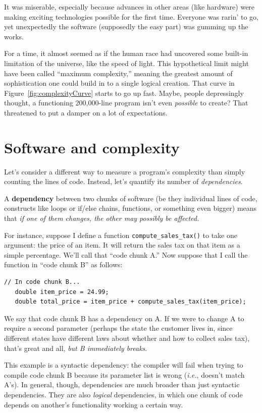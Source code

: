 It was miserable, especially because advances in other areas (like hardware)
were making exciting technologies possible for the first time. Everyone was
rarin' to go, yet unexpectedly the software (supposedly the easy part) was
gumming up the works.

For a time, it almost seemed as if the human race had uncovered some built-in
limitation of the universe, like the speed of light. This hypothetical limit
might have been called ``maximum complexity,'' meaning the greatest amount of
sophistication one could build in to a single logical creation. That curve in
Figure~\ref{fig:complexityCurve} starts to go up fast. Maybe, people
depressingly thought, a functioning 200,000-line program isn't even
\textit{possible} to create? That threatened to put a damper on a lot of
expectations.

\section{Software and complexity}

Let's consider a different way to measure a program's complexity than simply
counting the lines of code. Instead, let's quantify its number of
\textit{dependencies}.

A \textbf{dependency} between two chunks of software (be they individual lines
of code, constructs like loops or if/else chains, functions, or something even
bigger) means that \textit{if one of them changes, the other may possibly be
affected.}

For instance, suppose I define a function \texttt{compute\_sales\_tax()} to
take one argument: the price of an item. It will return the sales tax on that
item as a simple percentage. We'll call that ``code chunk A.'' Now suppose
that I call the function in ``code chunk B'' as follows:

\begin{Verbatim}[fontsize=\small,samepage=true,frame=single]
   // In code chunk B...
   double item_price = 24.99;
   double total_price = item_price + compute_sales_tax(item_price);
\end{Verbatim}

We say that code chunk B has a dependency on A. If we were to change A to
require a second parameter (perhaps the state the customer lives in, since
different states have different laws about whether and how to collect sales
tax), that's great and all, \textit{but B immediately breaks}.

This example is a syntactic dependency: the compiler will fail when trying to
compile code chunk B because its parameter list is wrong (\textit{i.e.},
doesn't match A's). In general, though, dependencies are much broader than
just syntactic dependencies. They are also \textit{logical} dependencies, in
which one chunk of code depends on another's functionality working a certain
way.

